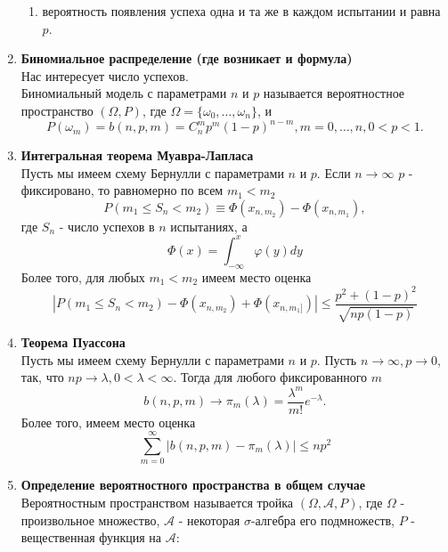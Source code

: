 \documentclass[A4]{article}
\begin{document}
\begin{enumerate}
\begin{enumerate}
		\item вероятность появления успеха одна и та же в каждом испытании и равна $p$.
	\end{enumerate} 
	\item \textbf{Биномиальное распределение (где возникает и формула)}\\
	Нас интересует  число успехов.\\
	Биномиальный модель с параметрами $n$ и $p$ называется вероятностное пространство $(\Omega,P)$, где $\Omega=\{\omega_0,\ldots,\omega_n\}$, и 
	\begin{equation}
	P(\omega_m)=b(n,p,m)=C_n^mp^m(1-p)^{n-m},m=0,\ldots,n,0<p<1.
	\end{equation}
	\item \textbf{Интегральная теорема Муавра-Лапласа}\\
	Пусть мы имеем схему Бернулли с параметрами $n$ и $p$. Если $n\rightarrow\infty$ $p$ - фиксировано, то равномерно по всем $m_1<m_2$ 
	\begin{equation}
	P(m_1\le S_n<m_2)\equiv\Phi(x_{n,m_2})-\Phi(x_{n,m_1}),
	\end{equation}
	где $S_n$ - число успехов в $n$ испытаниях, а 
	\begin{equation}
	\Phi(x)=\int_{-\infty}^{x}\varphi(y)dy
	\end{equation}
	Более того, для любых $m_1<m_2$ имеем место оценка
	\begin{equation}
	|P(m_1\le S_n<m_2)-\Phi(x_{n,m_2})+\Phi(x_{n,m_1]})|\le \frac{p^2+(1-p)^2}{\sqrt{np(1-p)}}
	\end{equation}
	\item \textbf{Теорема Пуассона}\\
	Пусть мы имеем схему Бернулли с параметрами $n$ и $p$. Пусть $n\rightarrow\infty,p\rightarrow0$, так, что $np\rightarrow\lambda,0<\lambda<\infty$. Тогда для любого фиксированного $m$
	\begin{equation}
	b(n,p,m)\rightarrow\pi_m(\lambda)=\frac{\lambda^m}{m!}e^{-\lambda}.
	\end{equation}
	Более того, имеем место оценка
	\begin{equation}
	\sum_{m=0}^{\infty} |b(n,p,m)-\pi_m(\lambda)|\le np^2
	\end{equation}
	\item \textbf{Определение вероятностного пространства в общем случае}\\
	Вероятностным пространством называется тройка $(\Omega,\mathcal{A},P)$, где $\Omega$ - произвольное множество, $\mathcal{A}$ - некоторая $\sigma$-алгебра его подмножеств, $P$ - вещественная функция на $\mathcal{A}$:

\end{enumerate}
\end{document}
